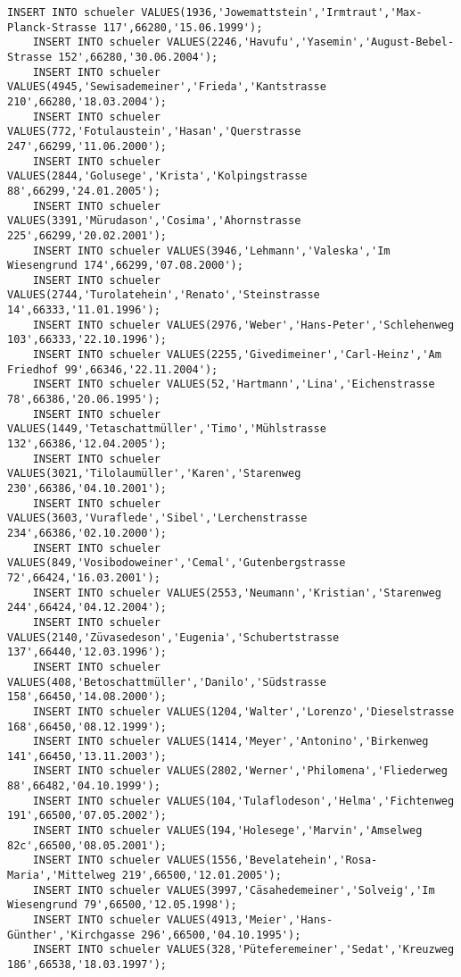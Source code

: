 \begin{lstlisting}[breaklines=True, numbers=none, basicstyle=\tiny, keepspaces=false]
	INSERT INTO schueler VALUES(1936,'Jowemattstein','Irmtraut','Max-Planck-Strasse 117',66280,'15.06.1999');
	INSERT INTO schueler VALUES(2246,'Havufu','Yasemin','August-Bebel-Strasse 152',66280,'30.06.2004');
	INSERT INTO schueler VALUES(4945,'Sewisademeiner','Frieda','Kantstrasse 210',66280,'18.03.2004');
	INSERT INTO schueler VALUES(772,'Fotulaustein','Hasan','Querstrasse 247',66299,'11.06.2000');
	INSERT INTO schueler VALUES(2844,'Golusege','Krista','Kolpingstrasse 88',66299,'24.01.2005');
	INSERT INTO schueler VALUES(3391,'Mürudason','Cosima','Ahornstrasse 225',66299,'20.02.2001');
	INSERT INTO schueler VALUES(3946,'Lehmann','Valeska','Im Wiesengrund 174',66299,'07.08.2000');
	INSERT INTO schueler VALUES(2744,'Turolatehein','Renato','Steinstrasse 14',66333,'11.01.1996');
	INSERT INTO schueler VALUES(2976,'Weber','Hans-Peter','Schlehenweg 103',66333,'22.10.1996');
	INSERT INTO schueler VALUES(2255,'Givedimeiner','Carl-Heinz','Am Friedhof 99',66346,'22.11.2004');
	INSERT INTO schueler VALUES(52,'Hartmann','Lina','Eichenstrasse 78',66386,'20.06.1995');
	INSERT INTO schueler VALUES(1449,'Tetaschattmüller','Timo','Mühlstrasse 132',66386,'12.04.2005');
	INSERT INTO schueler VALUES(3021,'Tilolaumüller','Karen','Starenweg 230',66386,'04.10.2001');
	INSERT INTO schueler VALUES(3603,'Vuraflede','Sibel','Lerchenstrasse 234',66386,'02.10.2000');
	INSERT INTO schueler VALUES(849,'Vosibodoweiner','Cemal','Gutenbergstrasse 72',66424,'16.03.2001');
	INSERT INTO schueler VALUES(2553,'Neumann','Kristian','Starenweg 244',66424,'04.12.2004');
	INSERT INTO schueler VALUES(2140,'Züvasedeson','Eugenia','Schubertstrasse 137',66440,'12.03.1996');
	INSERT INTO schueler VALUES(408,'Betoschattmüller','Danilo','Südstrasse 158',66450,'14.08.2000');
	INSERT INTO schueler VALUES(1204,'Walter','Lorenzo','Dieselstrasse 168',66450,'08.12.1999');
	INSERT INTO schueler VALUES(1414,'Meyer','Antonino','Birkenweg 141',66450,'13.11.2003');
	INSERT INTO schueler VALUES(2802,'Werner','Philomena','Fliederweg 88',66482,'04.10.1999');
	INSERT INTO schueler VALUES(104,'Tulaflodeson','Helma','Fichtenweg 191',66500,'07.05.2002');
	INSERT INTO schueler VALUES(194,'Holesege','Marvin','Amselweg 82c',66500,'08.05.2001');
	INSERT INTO schueler VALUES(1556,'Bevelatehein','Rosa-Maria','Mittelweg 219',66500,'12.01.2005');
	INSERT INTO schueler VALUES(3997,'Cäsahedemeiner','Solveig','Im Wiesengrund 79',66500,'12.05.1998');
	INSERT INTO schueler VALUES(4913,'Meier','Hans-Günther','Kirchgasse 296',66500,'04.10.1995');
	INSERT INTO schueler VALUES(328,'Püteferemeiner','Sedat','Kreuzweg 186',66538,'18.03.1997');

\end{lstlisting}
